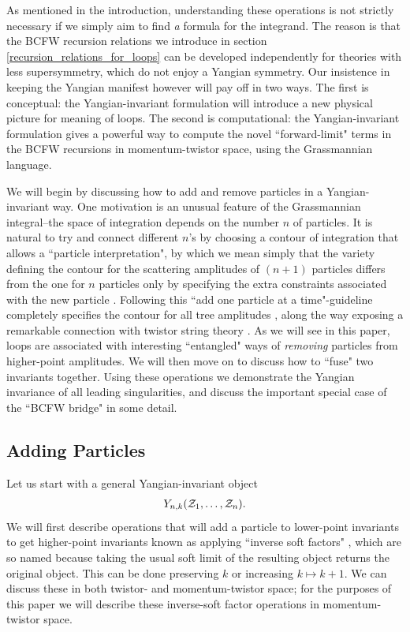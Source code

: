 \documentclass[11pt, reqno]{article}
\newcommand{\be}{\begin{eqnarray}}
\newcommand{\ee}{\end{eqnarray}}
\begin{document}
As mentioned in the introduction, understanding these operations is not strictly necessary if we simply aim to find {\it a} formula for the integrand. The reason is that the BCFW recursion relations we introduce in section \ref{recursion_relations_for_loops} can be developed independently for theories with less supersymmetry, which do not enjoy a Yangian symmetry. Our insistence in keeping the Yangian manifest however will pay off in two ways. The first is conceptual: the Yangian-invariant formulation will introduce a new physical picture for meaning of loops. The second is  computational: the Yangian-invariant formulation gives a powerful way to compute the novel ``forward-limit" terms in the BCFW recursions in momentum-twistor space, using the Grassmannian language.

We will begin by discussing how to add and remove particles in a Yangian-invariant way. One motivation is an unusual feature of the Grassmannian integral--the space of
integration depends on the number $n$ of particles. It is natural to try and connect different $n$'s by choosing a contour of integration that allows a ``particle interpretation", by which we mean simply that the variety defining the contour for the scattering amplitudes of $(n+1)$ particles differs from the one for $n$ particles only by specifying the extra constraints associated with the new particle \cite{ArkaniHamed:2009dg}. Following this ``add one particle at a time"-guideline completely specifies the contour for all tree amplitudes \cite{ArkaniHamed:2009dg,Bourjaily:2010kw}, along the way exposing a remarkable connection with twistor string theory \cite{Witten:2003nn,Roiban:2004yf,NVW,SV,DG}. As we will see in this paper, loops are associated with interesting ``entangled" ways of {\it removing} particles from higher-point amplitudes. We will then move on to discuss how to ``fuse" two invariants together. Using these operations we demonstrate the Yangian invariance of all leading singularities, and discuss the important special case of the ``BCFW bridge" in some detail.



\subsection{Adding Particles}

Let us start with a general Yangian-invariant object \be Y_{n,k}({\cal Z}_1,
\ldots, {\cal Z}_n). \ee
We will first describe operations that will add a particle to lower-point invariants to get
higher-point invariants known as applying ``inverse soft factors" \cite{ABCCKT:2010}, which are so named because taking the usual soft limit of the resulting object returns the original object. This can be done preserving $k$ or increasing $k \mapsto k +1$. We can discuss these in both twistor- and momentum-twistor space; for the purposes of this paper we will describe these inverse-soft factor operations in momentum-twistor space.
\end{document}
